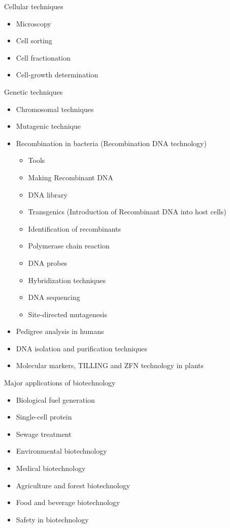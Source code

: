 \documentclass[
  ignorenonframetext,
  aspectratio=169]{beamer}
\providecommand{\tightlist}{%
  \setlength{\itemsep}{0pt}\setlength{\parskip}{0pt}}
\begin{document}
\begin{frame}{Cellular techniques}
\protect\hypertarget{cellular-techniques}{}
\begin{itemize}
\tightlist
\item
  Microscopy
\item
  Cell sorting
\item
  Cell fractionation
\item
  Cell-growth determination
\end{itemize}
\end{frame}

\begin{frame}{Genetic techniques}
\protect\hypertarget{genetic-techniques}{}
\begin{itemize}
\tightlist
\item
  Chromosomal techniques
\item
  Mutagenic technique
\item
  Recombination in bacteria (Recombination DNA technology)

  \begin{itemize}
  \tightlist
  \item
    Tools
  \item
    Making Recombinant DNA
  \item
    DNA library
  \item
    Transgenics (Introduction of Recombinant DNA into host cells)
  \item
    Identification of recombinants
  \item
    Polymerase chain reaction
  \item
    DNA probes
  \item
    Hybridization techniques
  \item
    DNA sequencing
  \item
    Site-directed mutagenesis
  \end{itemize}
\item
  Pedigree analysis in humans
\item
  DNA isolation and purification techniques
\item
  Molecular markers, TILLING and ZFN technology in plants
\end{itemize}
\end{frame}

\begin{frame}{Major applications of biotechnology}
\protect\hypertarget{major-applications-of-biotechnology}{}
\begin{itemize}
\tightlist
\item
  Biological fuel generation
\item
  Single-cell protein
\item
  Sewage treatment
\item
  Environmental biotechnology
\item
  Medical biotechnology
\item
  Agriculture and forest biotechnology
\item
  Food and beverage biotechnology
\item
  Safety in biotechnology
\end{itemize}
\end{frame}
\end{document}
